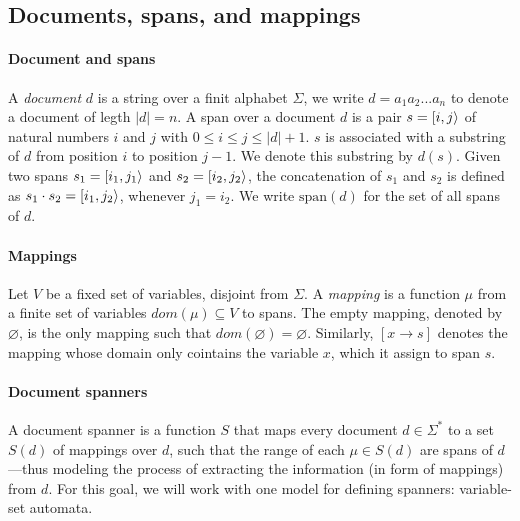 
\subsection{Documents, spans, and mappings}

\paragraph{Document and spans} A \emph{document} $d$ is a string over a finit alphabet $\Sigma$, we write $d= a_1a_2...a_{n}$ to denote a document of legth $|d| = n$. A span over a document $d$ is a pair $s = [i,j\rangle$ of natural numbers $i$ and $j$ with $0 \leq i \leq j \leq |d| + 1$. $s$ is associated with a substring of $d$ from position $i$ to position $j-1$. We denote this substring by $d(s)$. Given two spans $s_1 = [i_1, j_1\rangle$ and $s_2 = [i_2, j_2\rangle$, the concatenation of $s_1$ and $s_2$ is defined as $s_1 \cdot s_2 = [i_1, j_2\rangle$, whenever $j_1 = i_2$.
We write $\mathrm{span}(d)$ for the set of all spans of $d$.

\paragraph{Mappings} Let $V$ be a fixed set of variables, disjoint from $\Sigma$. A \textit{mapping} is a function $\mu$ from a finite set of variables $dom(\mu) \subseteq V$ to spans. The empty mapping, denoted by $\varnothing$, is the only mapping such that $dom(\varnothing) = \varnothing$. Similarly, $[x \xrightarrow{} s]$ denotes the mapping whose domain only cointains the variable $x$, which it assign to span $s$.

\paragraph{Document spanners} A document spanner is a function $S$ that maps every document $d \in \Sigma^*$ to a set $S(d)$ of mappings over $d$, such that the range of each $\mu \in S(d)$ are spans of $d$—thus modeling the process of extracting the information (in form of mappings) from $d$. For this goal, we will work with one model for defining spanners: variable-set automata.


